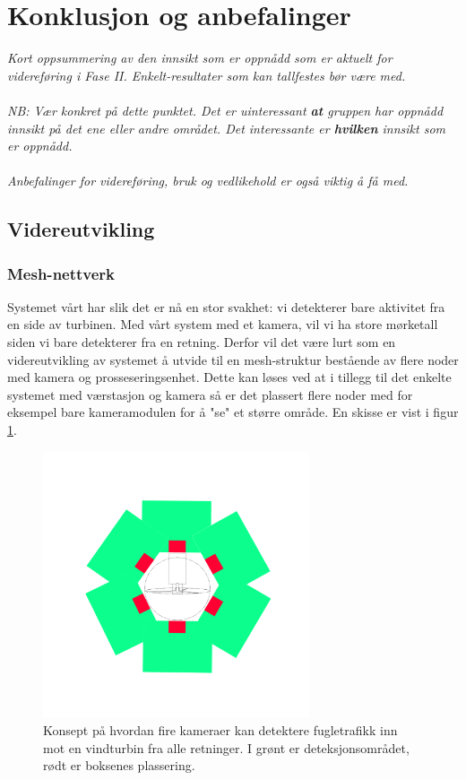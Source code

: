 \section{Konklusjon og anbefalinger}
\label{sec:konklusjon}
\textit{Kort oppsummering av den innsikt som er oppnådd som er aktuelt for videreføring i Fase II. Enkelt-resultater som kan tallfestes bør være med.\\
\\
NB: Vær konkret på dette punktet. Det er uinteressant \textbf{at} gruppen har oppnådd innsikt på det ene eller andre området. Det interessante er \textbf{hvilken} innsikt som er oppnådd. \\
\\
Anbefalinger for videreføring, bruk og vedlikehold er også viktig å få med.}


\subsection{Videreutvikling}

\subsubsection{Mesh-nettverk}

Systemet vårt har slik det er nå en stor svakhet: vi detekterer bare aktivitet fra en side av turbinen. Med vårt system med et kamera, vil vi ha store mørketall siden vi bare detekterer fra en retning. Derfor vil det være lurt som en videreutvikling av systemet å utvide til en mesh-struktur bestående av flere noder med kamera og prosseseringsenhet. Dette kan løses ved at i tillegg til det enkelte systemet med værstasjon og kamera så er det plassert flere noder med for eksempel bare kameramodulen for å "se" et større område. En skisse er vist i figur \ref{fig:fraoven}.

\begin{figure}[H]
    \centering
    \includegraphics[width=0.7\textwidth]{konklusjon/Nettverk.png}
    \caption{Konsept på hvordan fire kameraer kan detektere fugletrafikk inn mot en vindturbin fra alle retninger. I grønt er deteksjonsområdet, rødt er boksenes plassering.}
    \label{fig:fraoven}
\end{figure}


